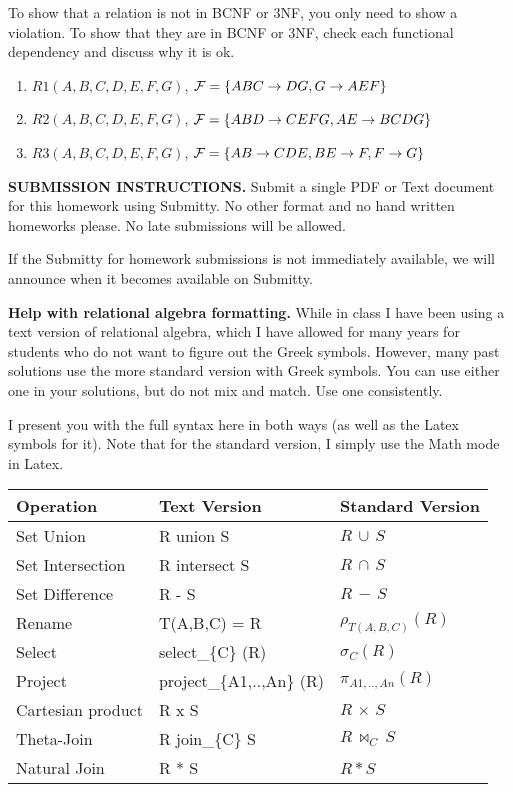 \documentclass[11pt]{article}
\begin{document}
To show that a relation is not in BCNF or 3NF, you only need to show a
violation. To show that they are in BCNF or 3NF, check each functional
dependency and discuss why it is ok.

\begin{enumerate}

\item $R1(A,B,C,D,E,F,G)$, ${\cal F} = \{ABC\rightarrow DG, G\rightarrow AEF \}$

\item $R2(A,B,C,D,E,F,G)$, ${\cal F} = \{ABD\rightarrow CEFG, AE\rightarrow BCDG \}$

\item $R3(A,B,C,D,E,F,G)$, ${\cal F} = \{AB\rightarrow CDE, BE\rightarrow F, F\rightarrow G \}$

\end{enumerate}


{\bf SUBMISSION INSTRUCTIONS.} Submit a single PDF or Text
document for this homework using Submitty. No other format and no hand
written homeworks please. No late submissions will be allowed.

If the Submitty for homework submissions is not immediately available,
we will announce when it becomes available on Submitty. 

{\bf Help with relational algebra formatting.} While in class I have
been using a text version of relational algebra, which I have allowed
for many years for students who do not want to figure out the Greek
symbols. However, many past solutions use the more standard version
with Greek symbols. You can use either one in your solutions, but do
not mix and match. Use one consistently.

I present you with the full syntax here in both ways (as well as the
Latex symbols for it). Note that for the standard version, I simply
use the Math mode in Latex.

\begin{tabular}{l|l|l}
  Operation & Text Version & Standard Version \\ \hline
   Set Union & R union S & $R \,\cup\, S $ \\
   Set Intersection & R intersect S & $R \,\cap\, S $ \\
   Set Difference & R - S & $R \,-\, S $ \\
   Rename &   T(A,B,C) = R & $\rho_{T(A,B,C)} (R)$ \\
   Select & select\_\{C\} (R) & $\sigma_{C} (R)$ \\
   Project & project\_\{A1,..,An\} (R) & $\pi_{A1,..,An} (R)$ \\
   Cartesian product & R x S & $R \,\times\, S$ \\
   Theta-Join & R join\_\{C\} S & $R \,\bowtie_{C}\, S$ \\
   Natural Join & R * S & $R * S$ \\
  \end{tabular}
\end{document}
